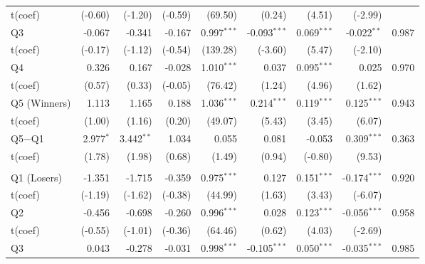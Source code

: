 {\begin{longtable}[t]{lrrrrrrrr}
\hspace{1em}t(coef) & (-0.60) & (-1.20) & (-0.59) & (69.50) & (0.24) & (4.51) & (-2.99) & \\
\hspace{1em}Q3 & -0.067 & -0.341 & -0.167 & 0.997$^{***}$ & -0.093$^{***}$ & 0.069$^{***}$ & -0.022$^{**}$ & 0.987\\
\hspace{1em}t(coef) & (-0.17) & (-1.12) & (-0.54) & (139.28) & (-3.60) & (5.47) & (-2.10) & \\
\hspace{1em}Q4 & 0.326 & 0.167 & -0.028 & 1.010$^{***}$ & 0.037 & 0.095$^{***}$ & 0.025 & 0.970\\
\hspace{1em}t(coef) & (0.57) & (0.33) & (-0.05) & (76.42) & (1.24) & (4.96) & (1.62) & \\
\hspace{1em}Q5 (Winners) & 1.113 & 1.165 & 0.188 & 1.036$^{***}$ & 0.214$^{***}$ & 0.119$^{***}$ & 0.125$^{***}$ & 0.943\\
\hspace{1em}t(coef) & (1.00) & (1.16) & (0.20) & (49.07) & (5.43) & (3.45) & (6.07) & \\
\hspace{1em}Q5$-$Q1 & 2.977$^{*}$ & 3.442$^{**}$ & 1.034 & 0.055 & 0.081 & -0.053 & 0.309$^{***}$ & 0.363\\
\hspace{1em}t(coef) & (1.78) & (1.98) & (0.68) & (1.49) & (0.94) & (-0.80) & (9.53) & \\
\addlinespace[0.3em]
\hline
\multicolumn{9}{l}{Passive --- VW}\\
\hspace{1em}Q1 (Losers) & -1.351 & -1.715 & -0.359 & 0.975$^{***}$ & 0.127 & 0.151$^{***}$ & -0.174$^{***}$ & 0.920\\
\hspace{1em}t(coef) & (-1.19) & (-1.62) & (-0.38) & (44.99) & (1.63) & (3.43) & (-6.07) & \\
\hspace{1em}Q2 & -0.456 & -0.698 & -0.260 & 0.996$^{***}$ & 0.028 & 0.123$^{***}$ & -0.056$^{***}$ & 0.958\\
\hspace{1em}t(coef) & (-0.55) & (-1.01) & (-0.36) & (64.46) & (0.62) & (4.03) & (-2.69) & \\
\hspace{1em}Q3 & 0.043 & -0.278 & -0.031 & 0.998$^{***}$ & -0.105$^{***}$ & 0.050$^{***}$ & -0.035$^{***}$ & 0.985\\

\end{longtable}}
